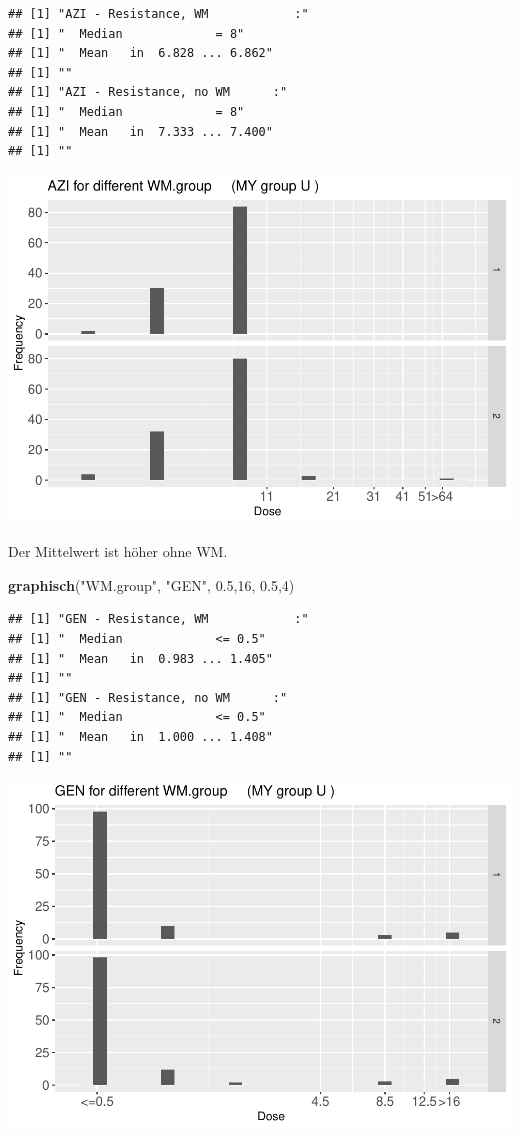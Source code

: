 \documentclass[
]{article}
\newenvironment{Shaded}{\begin{snugshade}}{\end{snugshade}}
\newcommand{\DecValTok}[1]{\textcolor[rgb]{0.00,0.00,0.81}{#1}}
\newcommand{\FloatTok}[1]{\textcolor[rgb]{0.00,0.00,0.81}{#1}}
\newcommand{\KeywordTok}[1]{\textcolor[rgb]{0.13,0.29,0.53}{\textbf{#1}}}
\newcommand{\NormalTok}[1]{#1}
\newcommand{\StringTok}[1]{\textcolor[rgb]{0.31,0.60,0.02}{#1}}
\begin{document}
\begin{verbatim}
## [1] "AZI - Resistance, WM            :"
## [1] "  Median             = 8"
## [1] "  Mean   in  6.828 ... 6.862"
## [1] ""
## [1] "AZI - Resistance, no WM      :"
## [1] "  Median             = 8"
## [1] "  Mean   in  7.333 ... 7.400"
## [1] ""
\end{verbatim}

\includegraphics{Verteilungen_files/figure-latex/unnamed-chunk-34-1.pdf}

Der Mittelwert ist höher ohne WM.

\begin{Shaded}
\begin{Highlighting}[]
  \KeywordTok{graphisch}\NormalTok{(}\StringTok{"WM.group"}\NormalTok{, }\StringTok{"GEN"}\NormalTok{, }\FloatTok{0.5}\NormalTok{,}\DecValTok{16}\NormalTok{, }\FloatTok{0.5}\NormalTok{,}\DecValTok{4}\NormalTok{)}
\end{Highlighting}
\end{Shaded}

\begin{verbatim}
## [1] "GEN - Resistance, WM            :"
## [1] "  Median             <= 0.5"
## [1] "  Mean   in  0.983 ... 1.405"
## [1] ""
## [1] "GEN - Resistance, no WM      :"
## [1] "  Median             <= 0.5"
## [1] "  Mean   in  1.000 ... 1.408"
## [1] ""
\end{verbatim}

\includegraphics{Verteilungen_files/figure-latex/unnamed-chunk-35-1.pdf}
\end{document}
